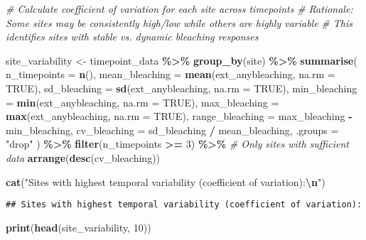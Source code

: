 \documentclass[
]{article}
\newenvironment{Shaded}{\begin{snugshade}}{\end{snugshade}}
\newcommand{\AttributeTok}[1]{\textcolor[rgb]{0.13,0.29,0.53}{#1}}
\newcommand{\CommentTok}[1]{\textcolor[rgb]{0.56,0.35,0.01}{\textit{#1}}}
\newcommand{\ConstantTok}[1]{\textcolor[rgb]{0.56,0.35,0.01}{#1}}
\newcommand{\DecValTok}[1]{\textcolor[rgb]{0.00,0.00,0.81}{#1}}
\newcommand{\FunctionTok}[1]{\textcolor[rgb]{0.13,0.29,0.53}{\textbf{#1}}}
\newcommand{\NormalTok}[1]{#1}
\newcommand{\OtherTok}[1]{\textcolor[rgb]{0.56,0.35,0.01}{#1}}
\newcommand{\SpecialCharTok}[1]{\textcolor[rgb]{0.81,0.36,0.00}{\textbf{#1}}}
\newcommand{\StringTok}[1]{\textcolor[rgb]{0.31,0.60,0.02}{#1}}
\begin{document}
\begin{Shaded}
\begin{Highlighting}[]
\CommentTok{\# Calculate coefficient of variation for each site across timepoints}
\CommentTok{\# Rationale: Some sites may be consistently high/low while others are highly variable}
\CommentTok{\# This identifies sites with stable vs. dynamic bleaching responses}

\NormalTok{site\_variability }\OtherTok{\textless{}{-}}\NormalTok{ timepoint\_data }\SpecialCharTok{\%\textgreater{}\%}
  \FunctionTok{group\_by}\NormalTok{(site) }\SpecialCharTok{\%\textgreater{}\%}
  \FunctionTok{summarise}\NormalTok{(}
    \AttributeTok{n\_timepoints =} \FunctionTok{n}\NormalTok{(),}
    \AttributeTok{mean\_bleaching =} \FunctionTok{mean}\NormalTok{(ext\_anybleaching, }\AttributeTok{na.rm =} \ConstantTok{TRUE}\NormalTok{),}
    \AttributeTok{sd\_bleaching =} \FunctionTok{sd}\NormalTok{(ext\_anybleaching, }\AttributeTok{na.rm =} \ConstantTok{TRUE}\NormalTok{),}
    \AttributeTok{min\_bleaching =} \FunctionTok{min}\NormalTok{(ext\_anybleaching, }\AttributeTok{na.rm =} \ConstantTok{TRUE}\NormalTok{),}
    \AttributeTok{max\_bleaching =} \FunctionTok{max}\NormalTok{(ext\_anybleaching, }\AttributeTok{na.rm =} \ConstantTok{TRUE}\NormalTok{),}
    \AttributeTok{range\_bleaching =}\NormalTok{ max\_bleaching }\SpecialCharTok{{-}}\NormalTok{ min\_bleaching,}
    \AttributeTok{cv\_bleaching =}\NormalTok{ sd\_bleaching }\SpecialCharTok{/}\NormalTok{ mean\_bleaching,}
    \AttributeTok{.groups =} \StringTok{"drop"}
\NormalTok{  ) }\SpecialCharTok{\%\textgreater{}\%}
  \FunctionTok{filter}\NormalTok{(n\_timepoints }\SpecialCharTok{\textgreater{}=} \DecValTok{3}\NormalTok{) }\SpecialCharTok{\%\textgreater{}\%}  \CommentTok{\# Only sites with sufficient data}
  \FunctionTok{arrange}\NormalTok{(}\FunctionTok{desc}\NormalTok{(cv\_bleaching))}

\FunctionTok{cat}\NormalTok{(}\StringTok{"Sites with highest temporal variability (coefficient of variation):}\SpecialCharTok{\textbackslash{}n}\StringTok{"}\NormalTok{)}
\end{Highlighting}
\end{Shaded}

\begin{verbatim}
## Sites with highest temporal variability (coefficient of variation):
\end{verbatim}

\begin{Shaded}
\begin{Highlighting}[]
\FunctionTok{print}\NormalTok{(}\FunctionTok{head}\NormalTok{(site\_variability, }\DecValTok{10}\NormalTok{))}
\end{Highlighting}
\end{Shaded}
\end{document}
